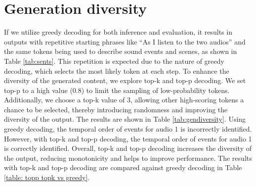 \section{Generation diversity} \label{appendix: diversity} \vspace{-0.1in}
If we utilize greedy decoding for both inference and evaluation, it results in outputs with repetitive starting phrases like “As I listen to the two audios” and the same tokens being used to describe sound events and scenes, as shown in Table \ref{tab:sents}. This repetition is expected due to the nature of greedy decoding, which selects the most likely token at each step. To enhance the diversity of the generated content, we explore top-k and top-p decoding. We set top-p to a high value (0.8) to limit the sampling of low-probability tokens. Additionally, we choose a top-k value of 3, allowing other high-scoring tokens a chance to be selected, thereby introducing randomness and improving the diversity of the output. The results are shown in Table \ref{tab:gendiversity}. Using greedy decoding, the temporal order of events for audio 1 is incorrectly identified. However, with top-k and top-p decoding, the temporal order of events for audio 1 is correctly identified. Overall, top-k and top-p decoding increases the diversity of the output, reducing monotonicity and helps to improve performance. The results with top-k and top-p decoding are compared against greedy decoding in Table \ref{table: topp topk vs greedy}. 

